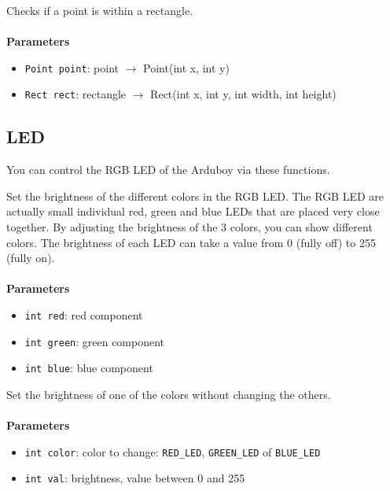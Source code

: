 \documentclass[11pt,fleqn]{book} %
\begin{document}
\begin{libf}
	Checks if a point is within a rectangle.\\ \\
	\textbf{Parameters}
	\begin{itemize}
		\item \texttt{Point point}: point $\rightarrow$ Point(int x, int y)
		\item \texttt{Rect rect}: rectangle $\rightarrow$ Rect(int x, int y, int width, int height)
	\end{itemize}
\end{libf}

\subsection{LED}
You can control the RGB LED of the Arduboy via these functions.

\begin{libf}
	Set the brightness of the different colors in the RGB LED. The RGB LED are actually small individual red, green and blue LEDs that are placed very close together. By adjusting the brightness of the 3 colors, you can show different colors.
	The brightness of each LED can take a value from 0 (fully off) to 255 (fully on).\\ \\

	\textbf{Parameters}
	\begin{itemize}
		\item \texttt{int red}: red component
		\item \texttt{int green}: green component
		\item \texttt{int blue}: blue component
	\end{itemize}
\end{libf}

\begin{libf}
	Set the brightness of one of the colors without changing the others.\\ \\
	\textbf{Parameters}
	\begin{itemize}
		\item \texttt{int color}: color to change: \texttt{RED\_LED}, \texttt{GREEN\_LED} of \texttt{BLUE\_LED}
		\item \texttt{int val}: brightness, value between 0 and 255
	\end{itemize}
\end{libf}
\end{document}
